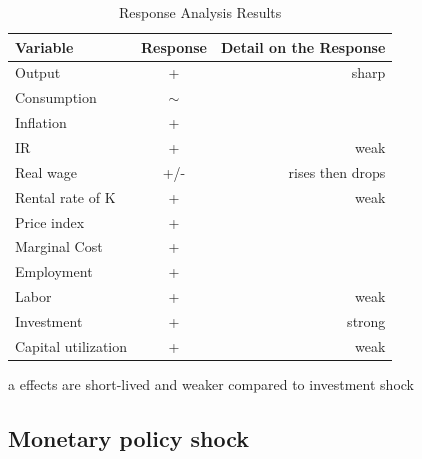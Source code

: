 \documentclass{article}
\begin{document}
\begin{table}[H]    
    \centering  
    \begin{threeparttable}    
    \caption{Response Analysis Results}    
    \label{tab:response_analysis}    
    \begin{tabular}{lcr}    
        \toprule    
        \textbf{Variable} & \textbf{Response} & \textbf{Detail on the Response} \\    
        \midrule    
        Output\tnote{a} & + & sharp  \\    
        Consumption & $\sim$ & \\ 
        Inflation\tnote{a} & + &  \\
        IR & + & weak \\   
        Real wage\tnote{a} & +/- & rises then drops\\  
        Rental rate of K & + & weak \\
        Price index & + & \\
        Marginal Cost\tnote{a} & + &  \\
        Employment\tnote{a} & + &  \\   
        Labor & + & weak \\
        Investment\tnote{a} & + & strong \\
        Capital utilization & + & weak\\
        \bottomrule    
    \end{tabular}  
    \begin{tablenotes}  
        \small  
        \item[a] effects are short-lived and weaker compared to investment shock
    \end{tablenotes}  
    \end{threeparttable}    
\end{table} 

\subsection{Monetary policy shock}
\end{document}
